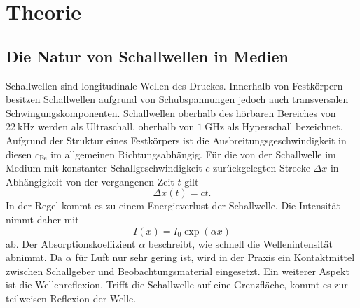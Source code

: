 
\section{Theorie}
\label{sec:Theorie}
\subsection{Die Natur von Schallwellen in Medien}
Schallwellen sind longitudinale Wellen des Druckes.
 Innerhalb von Festkörpern besitzen Schallwellen
aufgrund von Schubspannungen jedoch auch transversalen Schwingungskomponenten.
Schallwellen oberhalb des hörbaren Bereiches von $\SI{22}{\kilo\hertz}$ werden als
Ultraschall, oberhalb von $\SI{1}{\giga\hertz}$ als Hyperschall bezeichnet.
Aufgrund der Struktur eines Festkörpers ist die Ausbreitungsgeschwindigkeit in  diesen $c_\text{Fe}$ im allgemeinen Richtungsabhängig.
Für die von der Schallwelle im Medium mit konstanter Schallgeschwindigkeit $c$ zurückgelegten Strecke $\Delta x$ in Abhängigkeit von der vergangenen Zeit $t$ gilt
\begin{equation}
	\Delta x (t)= c t \label{MIST}\text{.}
\end{equation}
In der Regel kommt es zu einem Energieverlust der Schallwelle. Die Intensität nimmt daher mit
\begin{equation}
  I\left(x\right) = I_0 \exp\left(\alpha x\right)\label{I}
\end{equation}
ab. Der Absorptionskoeffizient $\alpha$ beschreibt, wie schnell die Wellenintensität
abnimmt. Da $\alpha$ für Luft nur sehr gering ist, wird in der Praxis ein Kontaktmittel
zwischen Schallgeber und Beobachtungsmaterial eingesetzt. Ein weiterer Aspekt ist die Wellenreflexion.
Trifft die Schallwelle auf eine Grenzfläche, kommt es zur teilweisen Reflexion der Welle.

